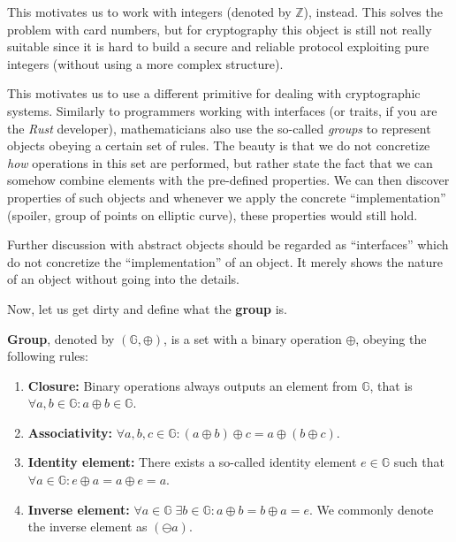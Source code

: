 \documentclass[../lecture-notes.tex]{subfiles}
\begin{document}
This motivates us to work with integers (denoted by $\mathbb{Z}$), instead. This solves the problem with card numbers, but for cryptography this object is still not really suitable since it is hard to build a secure and reliable protocol exploiting pure integers (without using a more complex structure). 

This motivates us to use a different primitive for dealing with cryptographic systems. Similarly to programmers working with interfaces (or traits, if you are the \textit{Rust} developer), mathematicians also use the so-called \textit{groups} to represent objects obeying a certain set of rules. The beauty is that we do not concretize \textit{how} operations in this set are performed, but rather state the fact that we can somehow combine elements with the pre-defined properties. We can then discover properties of such objects and whenever we apply the concrete ``implementation'' (spoiler, group of points on elliptic curve), these properties would still hold.

\begin{remark}
    Further discussion with abstract objects should be regarded as ``interfaces'' which do not concretize the ``implementation'' of an object. It merely shows the nature of an object without going into the details.
\end{remark}

\vspace{-0.2em}

Now, let us get dirty and define what the \textbf{group} is.

\vspace{-0.5em}

\begin{definition}
    \textbf{Group}, denoted by $(\mathbb{G}, \oplus)$, is a set with a binary operation $\oplus$, obeying the following rules:
    \begin{enumerate}
        \item \textbf{Closure:} Binary operations always outputs an element from $\mathbb{G}$, that is $\forall a,b \in \mathbb{G}: a \oplus b \in \mathbb{G}$.
        \item \textbf{Associativity:} $\forall a,b,c \in \mathbb{G}: (a \oplus b)\oplus c = a \oplus (b \oplus c)$.
        \item \textbf{Identity element:} There exists a so-called identity element $e \in \mathbb{G}$ such that $\forall a \in \mathbb{G}: e \oplus a = a \oplus e = a$.
        \item \textbf{Inverse element:} $\forall a \in \mathbb{G} \; \exists b \in \mathbb{G}: a\oplus b = b \oplus a = e$. We commonly denote the inverse element as $(\ominus a)$.
    \end{enumerate}
\end{definition}
\end{document}
